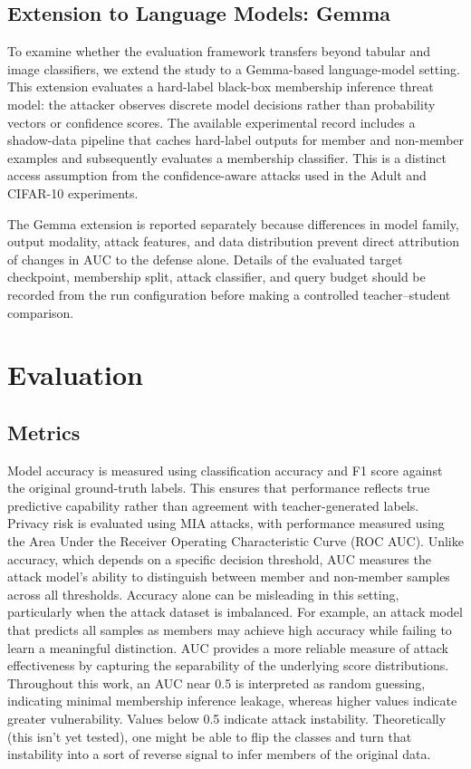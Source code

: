 \documentclass[conference]{IEEEtran}
\begin{document}
\subsection{Extension to Language Models: Gemma}
To examine whether the evaluation framework transfers beyond tabular and image classifiers, we extend the study to a Gemma-based language-model setting. This extension evaluates a hard-label black-box membership inference threat model: the attacker observes discrete model decisions rather than probability vectors or confidence scores. The available experimental record includes a shadow-data pipeline that caches hard-label outputs for member and non-member examples and subsequently evaluates a membership classifier. This is a distinct access assumption from the confidence-aware attacks used in the Adult and CIFAR-10 experiments.

The Gemma extension is reported separately because differences in model family, output modality, attack features, and data distribution prevent direct attribution of changes in AUC to the defense alone. Details of the evaluated target checkpoint, membership split, attack classifier, and query budget should be recorded from the run configuration before making a controlled teacher--student comparison.

\section{Evaluation}

\subsection{Metrics}
Model accuracy is measured using classification accuracy and F1 score against the original ground-truth labels. This ensures that performance reflects true predictive capability rather than agreement with teacher-generated labels.
Privacy risk is evaluated using MIA attacks, with performance measured using the Area Under the Receiver Operating Characteristic Curve (ROC AUC). Unlike accuracy, which depends on a specific decision threshold, AUC measures the attack model’s ability to distinguish between member and non-member samples across all thresholds.
Accuracy alone can be misleading in this setting, particularly when the attack dataset is imbalanced. For example, an attack model that predicts all samples as members may achieve high accuracy while failing to learn a meaningful distinction. AUC provides a more reliable measure of attack effectiveness by capturing the separability of the underlying score distributions.
Throughout this work, an AUC near 0.5 is interpreted as random guessing, indicating minimal membership inference leakage, whereas higher values indicate greater vulnerability. Values below 0.5 indicate attack instability. Theoretically (this isn’t yet tested), one might be able to flip the classes and turn that instability into a sort of reverse signal to infer members of the original data.
\end{document}
